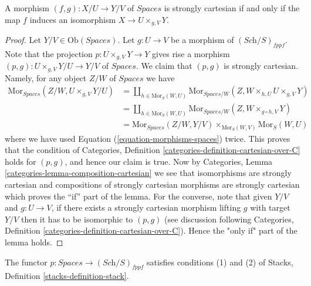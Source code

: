 \begin{lemma}
\label{lemma-spaces-strongly-cartesian}
A morphism $(f, g) : X/U \to Y/V$
of $\textit{Spaces}$ is strongly cartesian if and only if the
map $f$ induces an isomorphism $X \to U \times_{g, V} Y$.
\end{lemma}

\begin{proof}
Let $Y/V \in \text{Ob}(\textit{Spaces})$.
Let $g : U \to V$ be a morphism of $(\textit{Sch}/S)_{fppf}$.
Note that the projection $p : U \times_{g, V} Y \to Y$
gives rise a morphism
$(p, g) : U \times_{g, V} Y/U \to Y/V$ of $\textit{Spaces}$.
We claim that $(p, g)$ is strongly cartesian.
Namely, for any object $Z/W$ of $\textit{Spaces}$ we have
\begin{align*}
\text{Mor}_{\textit{Spaces}}(Z/W, U \times_{g, V} Y/U)
& =
\coprod\nolimits_{h \in \text{Mor}_S(W, U)}
\text{Mor}_{\textit{Spaces}/W}(Z, W \times_{h, U} U \times_{g, V} Y) \\
& =
\coprod\nolimits_{h \in \text{Mor}_S(W, U)}
\text{Mor}_{\textit{Spaces}/W}(Z, W \times_{g \circ h, V} Y) \\
& =
\text{Mor}_{\textit{Spaces}}(Z/W, Y/V)
\times_{\text{Mor}_S(W, V)} \text{Mor}_S(W, U)
\end{align*}
where we have used Equation (\ref{equation-morphisms-spaces}) twice.
This proves that the condition of
Categories, Definition \ref{categories-definition-cartesian-over-C}
holds for $(p, g)$, and hence our claim is true. Now by
Categories, Lemma \ref{categories-lemma-composition-cartesian}
we see that isomorphisms are strongly cartesian and
compositions of strongly cartesian morphisms are strongly cartesian
which proves the ``if'' part of the lemma. For the converse, note
that given $Y/V$ and $g : U \to V$, if there exists a
strongly cartesian morphism lifting $g$ with target $Y/V$
then it has to be isomorphic to $(p, g)$ (see discussion following
Categories, Definition \ref{categories-definition-cartesian-over-C}).
Hence the "only if" part of the lemma holds.
\end{proof}

\begin{lemma}
\label{lemma-pre-stack-of-spaces}
The functor $p : \textit{Spaces} \to (\textit{Sch}/S)_{fppf}$
satisfies conditions (1) and (2) of
Stacks, Definition \ref{stacks-definition-stack}.
\end{lemma}

